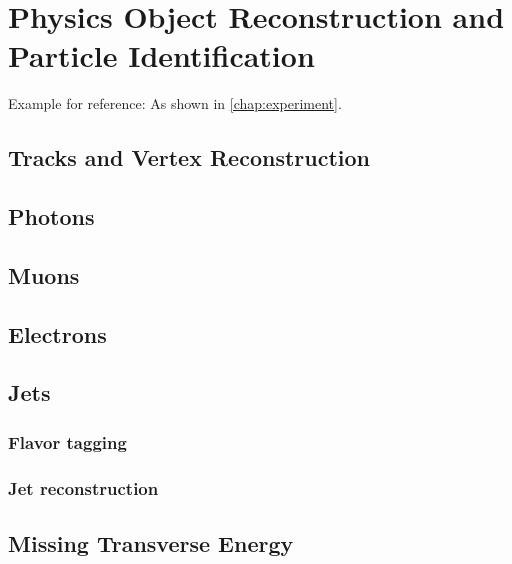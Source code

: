 
\chapter{Physics Object Reconstruction and Particle Identification}
\label{chap:objects}
Example for reference: As shown in \cref{chap:experiment}.

\section{Tracks and Vertex Reconstruction}
\section{Photons}
\section{Muons}
\section{Electrons}
\section{Jets}

\subsection{Flavor tagging}
\subsection{Jet reconstruction}

\section{Missing Transverse Energy}


